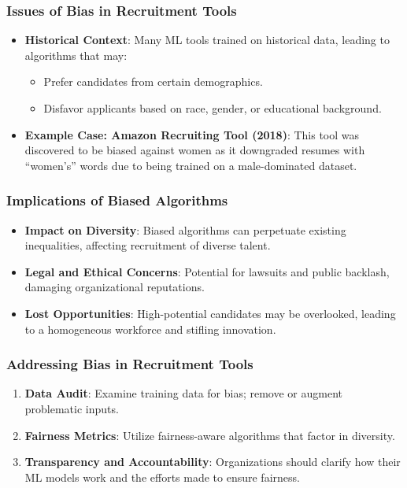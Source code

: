 \documentclass[aspectratio=169]{beamer}
\begin{document}
\begin{frame}[fragile]
    \frametitle{Issues of Bias in Recruitment Tools}
    \begin{itemize}
        \item \textbf{Historical Context}: Many ML tools trained on historical data, leading to algorithms that may:
            \begin{itemize}
                \item Prefer candidates from certain demographics.
                \item Disfavor applicants based on race, gender, or educational background.
            \end{itemize}
        
        \item \textbf{Example Case: Amazon Recruiting Tool (2018)}: 
            This tool was discovered to be biased against women as it downgraded resumes with “women’s” words due to being trained on a male-dominated dataset.
    \end{itemize}
\end{frame}

\begin{frame}[fragile]
    \frametitle{Implications of Biased Algorithms}
    \begin{itemize}
        \item \textbf{Impact on Diversity}: Biased algorithms can perpetuate existing inequalities, affecting recruitment of diverse talent.
        \item \textbf{Legal and Ethical Concerns}: Potential for lawsuits and public backlash, damaging organizational reputations.
        \item \textbf{Lost Opportunities}: High-potential candidates may be overlooked, leading to a homogeneous workforce and stifling innovation.
    \end{itemize}
\end{frame}

\begin{frame}[fragile]
    \frametitle{Addressing Bias in Recruitment Tools}
    \begin{enumerate}
        \item \textbf{Data Audit}: Examine training data for bias; remove or augment problematic inputs.
        \item \textbf{Fairness Metrics}: Utilize fairness-aware algorithms that factor in diversity.
        \item \textbf{Transparency and Accountability}: Organizations should clarify how their ML models work and the efforts made to ensure fairness.
    \end{enumerate}
\end{frame}
\end{document}
